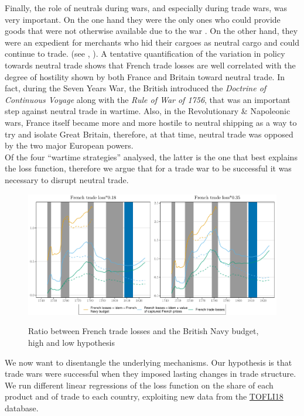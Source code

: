 \documentclass[12pt,a4paper,notitlepage,english]{article}
\begin{document}
Finally, the role of neutrals during wars, and especially during trade wars, was very important. On the one hand they were the only ones who could provide goods that were not otherwise available due to the war \citep{Hedberg2015}. On the other hand, they were an expedient for merchants who hid their cargoes as neutral cargo and could continue to trade. (see \citep{carriere1973negociants}, \cite{schnakenbourg2013guerre}). A tentative quantification of the variation in policy towards neutral trade shows that French trade losses are well correlated with the degree of hostility shown by both France and Britain toward neutral trade.
In fact, during the Seven Years War, the British introduced the \textit{Doctrine of Continuous Voyage} along with the \textit{Rule of War of 1756}, that was an important step against neutral trade in wartime. 
Also, in the Revolutionary \& Napoleonic wars, France itself became more and more hostile to neutral shipping as a way to try and isolate Great Britain, therefore, at that time, neutral trade was opposed by the two major European powers.  \\
Of the four ``wartime strategies'' analysed, the latter is the one that best explains the loss function, therefore we argue that for a trade war to be successful it was necessary to disrupt neutral trade. \\
\begin{figure}
    \centering
    \caption{Ratio between French trade losses and the British Navy budget, high and low hypothesis}
    \includegraphics[scale = .6]{ratio_BR_expenditures_ennual_loss.pdf}
    \label{fig:ratio_BR_expenditures_annual_loss}
\end{figure}
We now want to disentangle the underlying mechanisms.
Our hypothesis is that trade wars were successful when they imposed lasting changes in trade structure.
We run different linear regressions of the loss function on the share of each product and of trade to each country, exploiting new data from the \href{https://toflit18.hypotheses.org}{TOFLI18} database.
\end{document}
